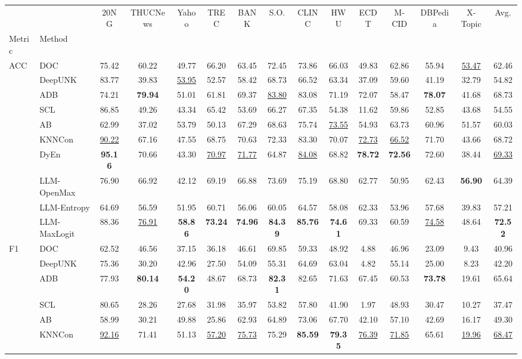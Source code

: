 \begin{tabular}{llccccccccccccc}
\toprule
&&20NG&THUCNews&Yahoo&TREC&BANK&S.O.&CLINC&HWU&ECDT&M-CID&DBPedia&X-Topic&Avg.\\
Metric&Method&&&&&&&&&&&&&\\
\midrule
\multirow[t]{10}{*}{ACC}&DOC&75.42&60.22&49.77&66.20&63.45&72.45&73.86&66.03&49.83&62.86&55.94&\underline{53.47}&62.46\\
&DeepUNK&83.77&39.83&\underline{53.95}&52.57&58.42&68.73&66.52&63.34&37.09&59.60&41.19&32.79&54.82\\
&ADB&74.21&\textbf{79.94}&51.01&61.81&69.37&\underline{83.80}&83.08&71.19&72.07&58.47&\textbf{78.07}&41.68&68.73\\
&SCL&86.85&49.26&43.34&65.42&53.69&66.27&67.35&54.38&11.62&59.86&52.85&43.68&54.55\\
&AB&62.99&37.02&53.79&50.13&67.29&68.63&75.74&\underline{73.55}&54.93&63.73&60.96&51.57&60.03\\
&KNNCon&\underline{90.22}&67.16&47.55&68.75&70.63&72.33&83.30&70.07&\underline{72.73}&\underline{66.52}&71.70&43.66&68.72\\
&DyEn&\textbf{95.16}&70.66&43.30&\underline{70.97}&\underline{71.77}&64.87&\underline{84.08}&68.82&\textbf{78.72}&\textbf{72.56}&72.60&38.44&\underline{69.33}\\
&LLM-OpenMax&76.90&66.92&42.12&69.19&66.88&73.69&75.19&68.80&62.77&50.95&62.43&\textbf{56.90}&64.39\\
&LLM-Entropy&64.69&56.59&51.95&60.71&56.06&60.05&64.57&58.08&62.33&53.96&57.68&39.83&57.21\\
&LLM-MaxLogit&88.36&\underline{76.91}&\textbf{58.86}&\textbf{73.24}&\textbf{74.96}&\textbf{84.39}&\textbf{85.76}&\textbf{74.61}&69.33&60.59&\underline{74.58}&48.64&\textbf{72.52}\\
\cline{1-15}
\multirow[t]{10}{*}{F1}&DOC&62.52&46.56&37.15&36.18&46.61&69.85&59.33&48.92&4.88&46.96&23.09&9.43&40.96\\
&DeepUNK&75.36&30.20&42.96&27.50&54.09&55.31&64.69&63.04&4.82&55.14&25.00&8.23&42.20\\
&ADB&77.93&\textbf{80.14}&\textbf{54.20}&48.67&68.73&\textbf{82.31}&82.65&71.63&67.45&60.53&\textbf{73.78}&19.61&65.64\\
&SCL&80.65&28.26&27.68&31.98&35.97&53.82&57.80&41.90&1.97&48.93&30.47&10.27&37.47\\
&AB&58.99&30.21&49.88&25.86&62.93&64.89&73.06&67.70&42.10&57.10&42.69&16.17&49.30\\
&KNNCon&\underline{92.16}&71.41&51.13&\underline{57.20}&\underline{75.73}&75.29&\textbf{85.59}&\textbf{79.35}&\underline{76.39}&\underline{71.85}&65.61&\underline{19.96}&\underline{68.47}\\

\end{tabular}
